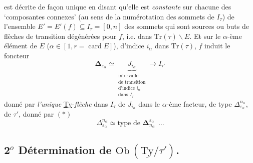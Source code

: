 \documentclass[11pt]{article}
\newcommand{\printedpage}[1]{\if\relax\detokenize{#1}\relax\else\marginpar{\raggedright\footnotesize p.~#1}\fi}
\newcommand{\msp}[1]{\marginpar{\raggedright\footnotesize [#1]}}
\newcommand{\uTy}{\underline{\mathrm{Ty}}}
\begin{document}
\printedpage{29}
\msp{page 45}est décrite de façon unique en disant qu'elle est \textit{constante} sur chacune des `composantes connexes' (au sens de la numérotation des sommets de $I_\tau$) de l'ensemble $E' = E'(f) \subseteq I_\tau = [0,n]$ des sommets qui sont sources ou buts de flèches de transition dégénérées pour $f$, i.e. dans $\mathrm{Tr}(\tau)\backslash E$. Et sur le $\alpha$-ème élément de $E$ ($\alpha \in [1, r = \operatorname{card} E]$), d'indice $i_\alpha$ dans $\mathrm{Tr}(\tau)$, $f$ induit le foncteur
\[
\boldsymbol{\Delta}_{\varepsilon_\alpha} \simeq \underbrace{J_{i_\alpha}}_{\substack{\text{intervalle}\\ \text{de transition}\\ \text{d'indice } i_\alpha\\ \text{dans } I_\tau}} \longrightarrow I_{\tau'}
\]
donné par \textit{l'unique} \underline{Ty}-\textit{flèche} dans $I_\tau$ de $J_{i_\alpha}$ dans le $\alpha$-ème facteur, de type $\Delta^{n_\alpha}_{\varepsilon_\alpha}$, de $\tau'$, donné par $(*)$
\[
\Delta^{n_\alpha}_{\varepsilon_\alpha} \simeq \text{type de } \boldsymbol{\Delta}^{\varepsilon_\alpha}_{n_\alpha}\ \ \ldots
\]

\subsection*{2$^o$ Détermination de $\mathrm{Ob}\,(\uTy/\tau')$.}
\end{document}
